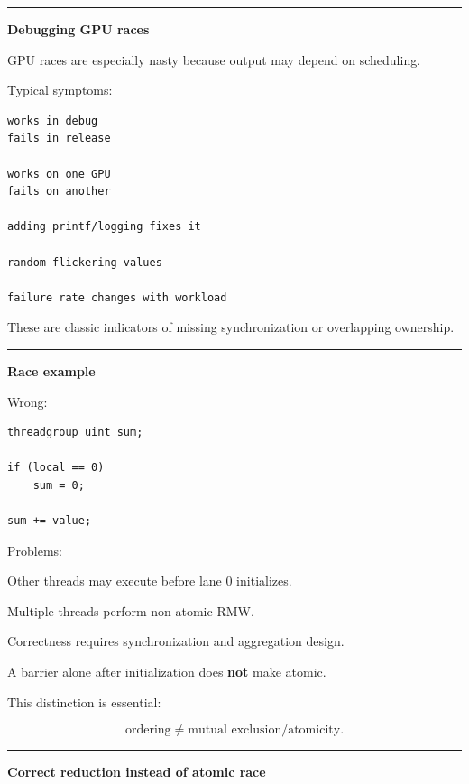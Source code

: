\begin{center}\rule{0.5\linewidth}{0.5pt}\end{center}

\textbf{Debugging GPU races}

GPU races are especially nasty because output may depend on scheduling.

Typical symptoms:

\protect{}\label{p10-race-symptoms}%
\begin{verbatim}
works in debug
fails in release

works on one GPU
fails on another

adding printf/logging fixes it

random flickering values

failure rate changes with workload
\end{verbatim}

These are classic indicators of missing synchronization or overlapping ownership.

\begin{center}\rule{0.5\linewidth}{0.5pt}\end{center}

\textbf{Race example}

Wrong:

\protect{}\label{p10-race}%
\begin{verbatim}
threadgroup uint sum;

if (local == 0)
    sum = 0;

sum += value;
\end{verbatim}

Problems:

Other threads may execute before lane 0 initializes.

Multiple threads perform non-atomic RMW.

Correctness requires synchronization and aggregation design.

A barrier alone after initialization does \textbf{not} make  atomic.

This distinction is essential:

\[
\boxed{
\text{ordering}
\neq
\text{mutual exclusion/atomicity}.
}
\]

\begin{center}\rule{0.5\linewidth}{0.5pt}\end{center}

\textbf{Correct reduction instead of atomic race}

